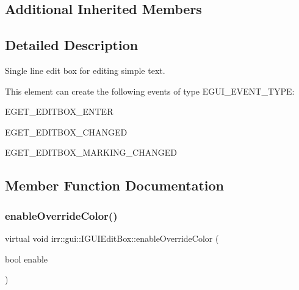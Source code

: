 \subsection*{Additional Inherited Members}


\subsection{Detailed Description}
Single line edit box for editing simple text. 

\begin{DoxyParagraph}{This element can create the following events of type E\+G\+U\+I\+\_\+\+E\+V\+E\+N\+T\+\_\+\+T\+Y\+PE\+:}
\begin{DoxyItemize}
\item E\+G\+E\+T\+\_\+\+E\+D\+I\+T\+B\+O\+X\+\_\+\+E\+N\+T\+ER \item E\+G\+E\+T\+\_\+\+E\+D\+I\+T\+B\+O\+X\+\_\+\+C\+H\+A\+N\+G\+ED \item E\+G\+E\+T\+\_\+\+E\+D\+I\+T\+B\+O\+X\+\_\+\+M\+A\+R\+K\+I\+N\+G\+\_\+\+C\+H\+A\+N\+G\+ED \end{DoxyItemize}

\end{DoxyParagraph}


\subsection{Member Function Documentation}
\mbox{\label{classirr_1_1gui_1_1IGUIEditBox_a121ab76cb2b69bbc4238921095917346}} 
\subsubsection{\texorpdfstring{enable\+Override\+Color()}{enableOverrideColor()}}
{\footnotesize\ttfamily virtual void irr\+::gui\+::\+I\+G\+U\+I\+Edit\+Box\+::enable\+Override\+Color (\begin{DoxyParamCaption}\item[{bool}]{enable }\end{DoxyParamCaption})\hspace{0.3cm}{\ttfamily [pure virtual]}}




